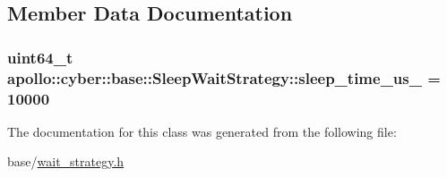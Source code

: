 \subsection{Member Data Documentation}
\hypertarget{classapollo_1_1cyber_1_1base_1_1SleepWaitStrategy_a3878d842918fde837f3835347990ac5c}{
\subsubsection[{sleep\-\_\-time\-\_\-us\-\_\-}]{\setlength{\rightskip}{0pt plus 5cm}uint64\-\_\-t apollo\-::cyber\-::base\-::\-Sleep\-Wait\-Strategy\-::sleep\-\_\-time\-\_\-us\-\_\- = 10000\hspace{0.3cm}{\ttfamily [private]}}}\label{classapollo_1_1cyber_1_1base_1_1SleepWaitStrategy_a3878d842918fde837f3835347990ac5c}


The documentation for this class was generated from the following file\-:\begin{DoxyCompactItemize}
\item 
base/\hyperlink{wait__strategy_8h}{wait\-\_\-strategy.\-h}\end{DoxyCompactItemize}
